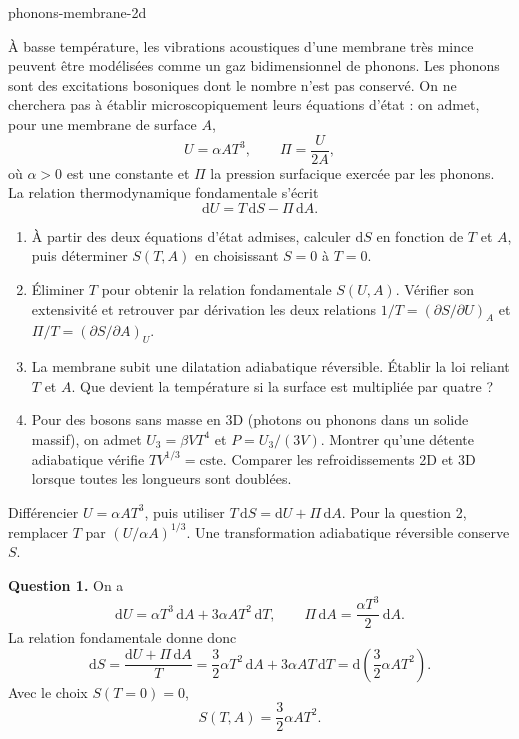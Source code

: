 \begin{exo}{phonons-membrane-2d}

À basse température, les vibrations acoustiques d'une membrane très mince peuvent être modélisées comme un gaz bidimensionnel de phonons. Les phonons sont des excitations bosoniques dont le nombre n'est pas conservé. On ne cherchera pas à établir microscopiquement leurs équations d'état : on admet, pour une membrane de surface $A$,
\[
U=\alpha A T^3,
\qquad
\Pi=\frac{U}{2A},
\]
où $\alpha>0$ est une constante et $\Pi$ la pression surfacique exercée par les phonons. La relation thermodynamique fondamentale s'écrit
\[
\mathrm dU=T\,\mathrm dS-\Pi\,\mathrm dA.
\]

\begin{enumerate}
\item À partir des deux équations d'état admises, calculer $\mathrm dS$ en fonction de $T$ et $A$, puis déterminer $S(T,A)$ en choisissant $S=0$ à $T=0$.
\item Éliminer $T$ pour obtenir la relation fondamentale $S(U,A)$. Vérifier son extensivité et retrouver par dérivation les deux relations $1/T=(\partial S/\partial U)_A$ et $\Pi/T=(\partial S/\partial A)_U$.
\item La membrane subit une dilatation adiabatique réversible. Établir la loi reliant $T$ et $A$. Que devient la température si la surface est multipliée par quatre ?
\item Pour des bosons sans masse en 3D (photons ou phonons dans un solide massif), on admet $U_3=\beta VT^4$ et $P=U_3/(3V)$. Montrer qu'une détente adiabatique vérifie $TV^{1/3}=\text{cste}$. Comparer les refroidissements 2D et 3D lorsque toutes les longueurs sont doublées.
\end{enumerate}

\begin{indication}
Différencier $U=\alpha AT^3$, puis utiliser $T\,\mathrm dS=\mathrm dU+\Pi\,\mathrm dA$. Pour la question 2, remplacer $T$ par $(U/\alpha A)^{1/3}$. Une transformation adiabatique réversible conserve $S$.
\end{indication}

\begin{solution}
\textbf{Question 1.} On a
\[
\mathrm dU=\alpha T^3\,\mathrm dA+3\alpha AT^2\,\mathrm dT,
\qquad
\Pi\,\mathrm dA=\frac{\alpha T^3}{2}\,\mathrm dA.
\]
La relation fondamentale donne donc
\[
\mathrm dS=\frac{\mathrm dU+\Pi\,\mathrm dA}{T}
=\frac{3}{2}\alpha T^2\,\mathrm dA+3\alpha AT\,\mathrm dT
=\mathrm d\!\left(\frac{3}{2}\alpha AT^2\right).
\]
Avec le choix $S(T=0)=0$,
\[
\boxed{S(T,A)=\frac{3}{2}\alpha AT^2.}
\]


\end{solution}
\end{exo}
